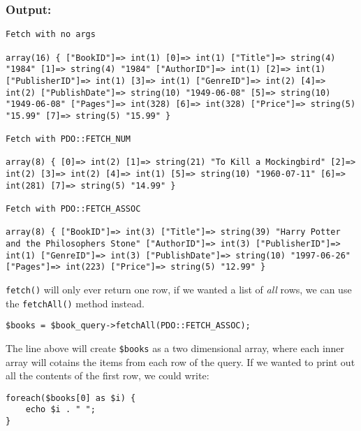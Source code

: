 \documentclass{report}
\begin{document}
\subsubsection*{Output:}
\begin{verbatim}
Fetch with no args

array(16) { ["BookID"]=> int(1) [0]=> int(1) ["Title"]=> string(4) "1984" [1]=> string(4) "1984" ["AuthorID"]=> int(1) [2]=> int(1) ["PublisherID"]=> int(1) [3]=> int(1) ["GenreID"]=> int(2) [4]=> int(2) ["PublishDate"]=> string(10) "1949-06-08" [5]=> string(10) "1949-06-08" ["Pages"]=> int(328) [6]=> int(328) ["Price"]=> string(5) "15.99" [7]=> string(5) "15.99" }

Fetch with PDO::FETCH_NUM

array(8) { [0]=> int(2) [1]=> string(21) "To Kill a Mockingbird" [2]=> int(2) [3]=> int(2) [4]=> int(1) [5]=> string(10) "1960-07-11" [6]=> int(281) [7]=> string(5) "14.99" }

Fetch with PDO::FETCH_ASSOC

array(8) { ["BookID"]=> int(3) ["Title"]=> string(39) "Harry Potter and the Philosophers Stone" ["AuthorID"]=> int(3) ["PublisherID"]=> int(1) ["GenreID"]=> int(3) ["PublishDate"]=> string(10) "1997-06-26" ["Pages"]=> int(223) ["Price"]=> string(5) "12.99" } 
\end{verbatim}
\bigbreak \noindent
\texttt{fetch()} will only ever return one row, if we wanted a list of \textit{all} rows, we can use the \texttt{fetchAll()} method instead.
\begin{verbatim}
$books = $book_query->fetchAll(PDO::FETCH_ASSOC);
\end{verbatim}
The line above will create \texttt{\$books} as a two dimensional array, where each inner array will cotains the items from each row of the query. If we wanted to print out all the contents of the first row, we could write:
\begin{verbatim}
foreach($books[0] as $i) {
    echo $i . " ";
}

\end{verbatim}
\end{document}
